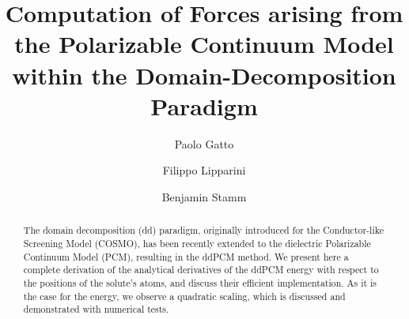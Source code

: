 \documentclass[aip,jcp,a4paper,11pt]{revtex4-1}
\begin{document}
\title{Computation of Forces arising from the Polarizable Continuum Model within the Domain-Decomposition Paradigm}

\author{Paolo Gatto}

\author{Filippo Lipparini}


\author{Benjamin Stamm}



\begin{abstract}
The domain decomposition (dd) paradigm, originally introduced for the Conductor-like Screening Model (COSMO), has been recently extended to the dielectric Polarizable Continuum Model (PCM), resulting in the ddPCM method. We present here a complete derivation of the analytical derivatives of the ddPCM energy with respect to the positions of the solute's atoms, and discuss their efficient implementation. As it is the case for the energy, we observe a quadratic scaling, which is discussed and demonstrated with numerical tests.  

\end{abstract}

\maketitle
\end{document}
